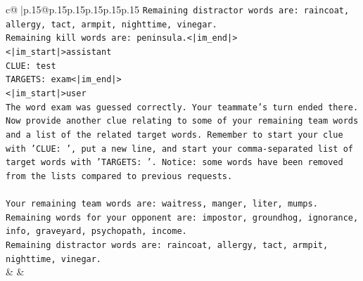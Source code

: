 \documentclass{article}
\begin{document}
{\begin{supertabular}{c@{$\;$}|p{.15\linewidth}@{}p{.15\linewidth}p{.15\linewidth}p{.15\linewidth}p{.15\linewidth}p{.15\linewidth}}
{{{\texttt{Remaining distractor words are: raincoat, allergy, tact, armpit, nighttime, vinegar.} \\
\texttt{Remaining kill words are: peninsula.<|im\_end|>} \\
\texttt{<|im\_start|>assistant} \\
\texttt{CLUE: test} \\
\texttt{TARGETS: exam<|im\_end|>} \\
\texttt{<|im\_start|>user} \\
\texttt{The word exam was guessed correctly. Your teammate's turn ended there.} \\
\texttt{Now provide another clue relating to some of your remaining team words and a list of the related target words. Remember to start your clue with 'CLUE: ', put a new line, and start your comma{-}separated list of target words with 'TARGETS: '. Notice: some words have been removed from the lists compared to previous requests.} \\
\\ 
\texttt{Your remaining team words are: waitress, manger, liter, mumps.} \\
\texttt{Remaining words for your opponent are: impostor, groundhog, ignorance, info, graveyard, psychopath, income.} \\
\texttt{Remaining distractor words are: raincoat, allergy, tact, armpit, nighttime, vinegar.} \\
            }
        }
    }
    & & \\ \\


\end{supertabular}}
\end{document}
